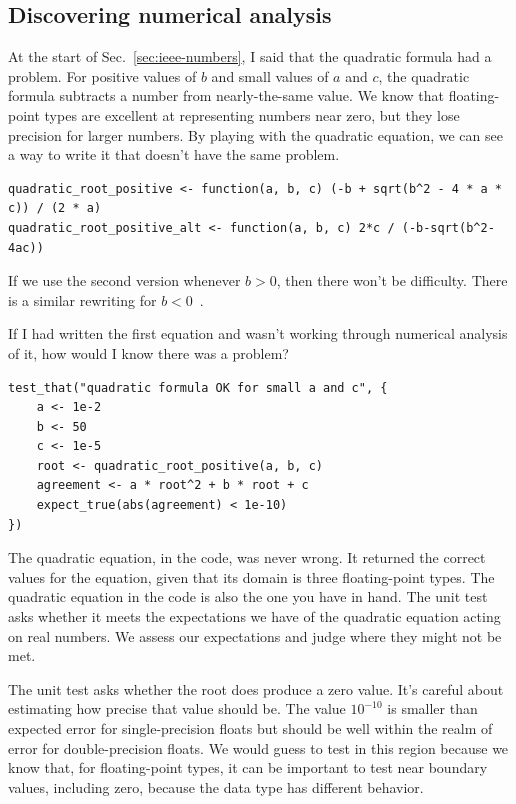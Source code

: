 \documentclass[fleqn,10pt]{olplainarticle}
\begin{document}
\subsection{Discovering numerical analysis}

At the start of Sec.~\ref{sec:ieee-numbers}, I said that the
quadratic formula had a problem. For positive values of $b$
and small values of $a$ and $c$, the quadratic formula subtracts
a number from nearly-the-same value. We know that floating-point
types are excellent at representing numbers near zero, but they
lose precision for larger numbers. By playing with the quadratic
equation, we can see a way to write it that doesn't have the same
problem.

\begin{lstlisting}
quadratic_root_positive <- function(a, b, c) (-b + sqrt(b^2 - 4 * a * c)) / (2 * a)
quadratic_root_positive_alt <- function(a, b, c) 2*c / (-b-sqrt(b^2-4ac))
\end{lstlisting}

If we use the second version whenever $b>0$, then there won't
be difficulty.
There is a similar rewriting for $b<0$~\citep{overton2001numerical}.

If I had written the first equation and wasn't working through
numerical analysis of it, how would I know there was a problem?

\begin{lstlisting}
test_that("quadratic formula OK for small a and c", {
    a <- 1e-2
    b <- 50
    c <- 1e-5
    root <- quadratic_root_positive(a, b, c)
    agreement <- a * root^2 + b * root + c
    expect_true(abs(agreement) < 1e-10)
})
\end{lstlisting}

The quadratic equation, in the code, was never wrong. It returned
the correct values for the equation, given that its domain is
three floating-point types. The quadratic equation in the code
is also the one you have in hand. The unit test asks whether
it meets the expectations we have of the quadratic equation
acting on real numbers. We assess our expectations and judge
where they might not be met.

\noindent{}The unit test asks whether the root does produce a
zero value. It's careful about estimating how precise that value
should be. The value $10^{-10}$ is smaller than expected error
for single-precision floats but should be well within the realm
of error for double-precision floats. We would guess to test
in this region because we know that, for floating-point types,
it can be important to test near boundary values, including
zero, because the data type has different behavior.
\end{document}

